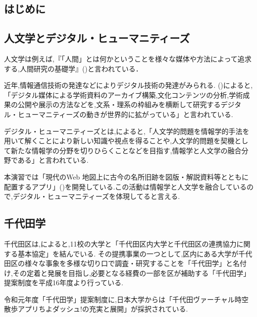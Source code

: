 \documentclass[a4paper, twoside]{jarticle}
\begin{document}
\maketitle %
\begin{multicols}{2} %
\setcounter{page}{1} %

\section{はじめに}

\subsection{人文学とデジタル・ヒューマニティーズ}
人文学は例えば,『「人間」とは何かということを様々な媒体や方法によって追求する,人間研究の基礎学』(\cite{huma})と言われている．\par
近年,情報通信技術の発達などによりデジタル技術の発達がみられる.
(\cite{digihumu1})によると,「デジタル媒体による学術資料のアーカイブ構築,文化コンテンツの分析,学術成果の公開や展示の方法などを,文系・理系の枠組みを横断して研究するデジタル・ヒューマニティーズの動きが世界的に拡がっている」と言われている.\par

デジタル・ヒューマニティーズとは,\cite{digihumu2}によると,「人文学的問題を情報学的手法を用いて解くことにより新しい知識や視点を得ることや,人文学的問題を契機として新たな情報学の分野を切りひらくことなどを目指す,情報学と人文学の融合分野である」と言われている.

本演習では「現代のWeb 地図上に古今の名所旧跡を図版・解説資料等とともに配置するアプリ」(\cite{tiyodagaku_houkokusyo})を開発している.この活動は情報学と人文学を融合しているので,デジタル・ヒューマニティーズを体現してると言える.


\subsection{千代田学}
千代田区は,\cite{digi4}によると,11校の大学と「千代田区内大学と千代田区の連携協力に関する基本協定」を結んでいる.
その提携事業の一つとして,区内にある大学が千代田区の様々な事象を多様な切り口で調査・研究することを「千代田学」と名付け,その定着と発展を目指し,必要となる経費の一部を区が補助する「千代田学」提案制度を平成16年度より行っている.

令和元年度「千代田学」提案制度に,日本大学からは「千代田ヴァーチャル時空散歩アプリちよダッシュ!の充実と展開」が採択されている.


\end{multicols}
\end{document}
